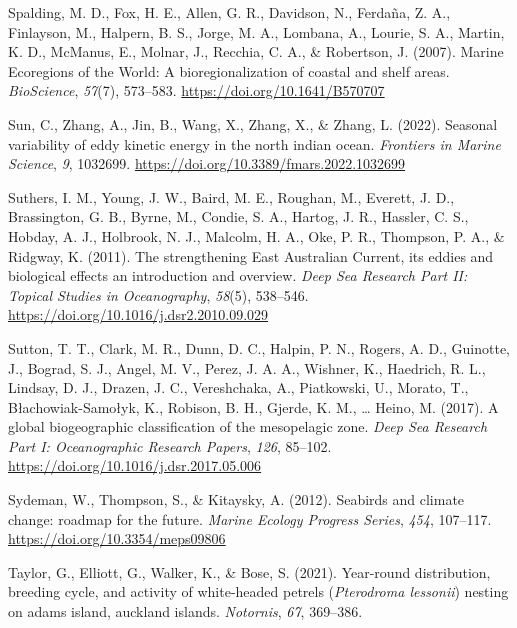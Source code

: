 \documentclass{article}
\newlength{\cslhangindent}
\newlength{\cslentryspacingunit} %
\newenvironment{CSLReferences}[2] %
 {%
  \setlength{\parindent}{0pt}
  \ifodd #1
  \let\oldpar\par
  \def\par{\hangindent=\cslhangindent\oldpar}
  \fi
  \setlength{\parskip}{#2\cslentryspacingunit}
 }%
 {}
\begin{document}
\begin{linenumbers}
\begin{CSLReferences}{1}{0}
\leavevmode{}%
Spalding, M. D., Fox, H. E., Allen, G. R., Davidson, N., Ferdaña, Z. A., Finlayson, M., Halpern, B. S., Jorge, M. A., Lombana, A., Lourie, S. A., Martin, K. D., McManus, E., Molnar, J., Recchia, C. A., \& Robertson, J. (2007). Marine {E}coregions of the {W}orld: A bioregionalization of coastal and shelf areas. \emph{BioScience}, \emph{57}(7), 573--583. \url{https://doi.org/10.1641/B570707}

\leavevmode{}%
Sun, C., Zhang, A., Jin, B., Wang, X., Zhang, X., \& Zhang, L. (2022). Seasonal variability of eddy kinetic energy in the north indian ocean. \emph{Frontiers in Marine Science}, \emph{9}, 1032699. \url{https://doi.org/10.3389/fmars.2022.1032699}

\leavevmode{}%
Suthers, I. M., Young, J. W., Baird, M. E., Roughan, M., Everett, J. D., Brassington, G. B., Byrne, M., Condie, S. A., Hartog, J. R., Hassler, C. S., Hobday, A. J., Holbrook, N. J., Malcolm, H. A., Oke, P. R., Thompson, P. A., \& Ridgway, K. (2011). The strengthening East Australian Current, its eddies and biological effects {\textemdash} an introduction and overview. \emph{Deep Sea Research Part II: Topical Studies in Oceanography}, \emph{58}(5), 538--546. \url{https://doi.org/10.1016/j.dsr2.2010.09.029}

\leavevmode{}%
Sutton, T. T., Clark, M. R., Dunn, D. C., Halpin, P. N., Rogers, A. D., Guinotte, J., Bograd, S. J., Angel, M. V., Perez, J. A. A., Wishner, K., Haedrich, R. L., Lindsay, D. J., Drazen, J. C., Vereshchaka, A., Piatkowski, U., Morato, T., Błachowiak-Samołyk, K., Robison, B. H., Gjerde, K. M., \ldots{} Heino, M. (2017). A global biogeographic classification of the mesopelagic zone. \emph{Deep Sea Research Part I: Oceanographic Research Papers}, \emph{126}, 85--102. \url{https://doi.org/10.1016/j.dsr.2017.05.006}

\leavevmode{}%
Sydeman, W., Thompson, S., \& Kitaysky, A. (2012). Seabirds and climate change: roadmap for the future. \emph{Marine Ecology Progress Series}, \emph{454}, 107--117. \url{https://doi.org/10.3354/meps09806}

\leavevmode{}%
Taylor, G., Elliott, G., Walker, K., \& Bose, S. (2021). Year-round distribution, breeding cycle, and activity of white-headed petrels ({\emph{Pterodroma lessonii}}) nesting on adams island, auckland islands. \emph{Notornis}, \emph{67}, 369--386.


\end{CSLReferences}
\end{linenumbers}
\end{document}
